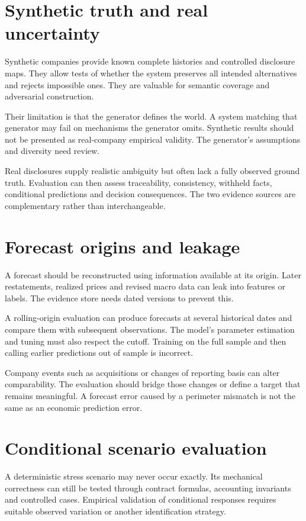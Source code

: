 \section{Synthetic truth and real uncertainty}
Synthetic companies provide known complete histories and controlled disclosure maps. They allow tests of whether the system preserves all intended alternatives and rejects impossible ones. They are valuable for semantic coverage and adversarial construction.

Their limitation is that the generator defines the world. A system matching that generator may fail on mechanisms the generator omits. Synthetic results should not be presented as real-company empirical validity. The generator's assumptions and diversity need review.

Real disclosures supply realistic ambiguity but often lack a fully observed ground truth. Evaluation can then assess traceability, consistency, withheld facts, conditional predictions and decision consequences. The two evidence sources are complementary rather than interchangeable.

\section{Forecast origins and leakage}
A forecast should be reconstructed using information available at its origin. Later restatements, realized prices and revised macro data can leak into features or labels. The evidence store needs dated versions to prevent this.

A rolling-origin evaluation can produce forecasts at several historical dates and compare them with subsequent observations. The model's parameter estimation and tuning must also respect the cutoff. Training on the full sample and then calling earlier predictions out of sample is incorrect.

Company events such as acquisitions or changes of reporting basis can alter comparability. The evaluation should bridge those changes or define a target that remains meaningful. A forecast error caused by a perimeter mismatch is not the same as an economic prediction error.

\section{Conditional scenario evaluation}
A deterministic stress scenario may never occur exactly. Its mechanical correctness can still be tested through contract formulas, accounting invariants and controlled cases. Empirical validation of conditional responses requires suitable observed variation or another identification strategy.

